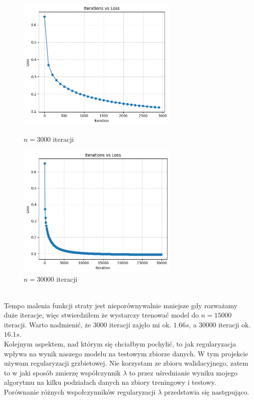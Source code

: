 \documentclass[polish,12pt,a4paper]{extarticle}
\begin{document}
\begin{figure}[h!]
    \centering
    \begin{minipage}[b]{0.35\textwidth}
    \includegraphics[width=0.7\textwidth]{img/it_loss_small.png}
    \caption{$n = 3000$ iteracji}
    \end{minipage} \hspace{}
    \begin{minipage}[b]{0.35\textwidth}
    \includegraphics[width=0.7\textwidth]{img/it_loss_big.png}
    \caption{$n = 30000$ iteracji}
    \end{minipage}
\end{figure} \smallskip \\ \FloatBarrier
Tempo malenia funkcji straty jest nieporównywalnie mniejsze gdy rozważamy duże iteracje, więc stwierdziłem że wystarczy trenować model do $n = 15000$ iteracji. Warto nadmienić, że $3000$ iteracji zajęło mi ok. $1.66s$, a $30000$ iteracji ok. $16.1s$. \bigskip \\
Kolejnym aspektem, nad którym się chciałbym pochylić, to jak regularyzacja wpływa na wynik naszego modelu na testowym zbiorze danych. W tym projekcie używam regularyzacji grzbietowej. Nie korzystam ze zbioru walidacyjnego, zatem to w jaki sposób zmierzę współczynnik $\lambda$ to przez uśrednianie wyniku mojego algorytmu na kilku podziałach danych na zbiory treningowy i testowy. Porównanie różnych wspołczynników regularyzacji $\lambda$ przedstawia się następująco. \smallskip \\
\end{document}
